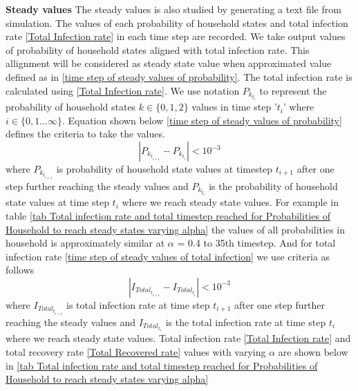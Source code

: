 \documentclass[paper=a4, fontsize=11pt, twoside, BCOR=12mm, parskip=full, listof=totoc]{scrreprt}
\begin{document}
{\par{\textbf{Steady values}}
The steady values is also studied by generating a text file from simulation. The values of each probability of household states and total infection rate \ref{Total Infection rate} in each time step are recorded. We take output values of probability of household states aligned with total infection rate. This allignment will be considered as steady state value when approximated value defined as in \ref{time step of steady values of probability}. The total infection rate is calculated using \ref{Total Infection rate}. We use notation $P_{k_{t_{i}}}$ to represent the probability of household states \( k \in \{0,1,2 \}\) values in time step '$t_{i}$' where \( i  \in \{0,1...\infty \} \).  
Equation shown below \ref{time step of steady values of probability} defines the criteria to take the values. 
\begin{equation}
\label{time step of steady values of probability}
 |P_{k_{t_{i+1}}}-P_{k_{t_{i}}}| < 10^{-3}
\end{equation} 
where $P_{k_{t_{i+1}}}$ is probability of household state values at timestep $t_{i+1}$ after one step further reaching the steady values and $P_{k_{t_{i}}}$ is the probability of household state values at time step $t_{i}$ where we reach steady state values. For example in table \ref{tab Total infection rate and total timestep reached for Probabilities of Household to reach steady states varying alpha} the values of all probabilities in household is approximately similar at $\alpha$ = 0.4 to 35th timestep.  
And for total infection rate \ref{time step of steady values of total infection} we use criteria as follows 
\begin{equation}
\label{time step of steady values of total infection}
 |I_{Total_{t_{i+1}}}-I_{Total_{{t_{i}}}}| < 10^{-3}
\end{equation} 
where $I_{Total_{t_{i+1}}}$ is total infection rate at time step $t_{i+1}$ after one step further reaching the steady values and $I_{Total_{t_{i}}}$ is the total infection rate at time step $t_{i}$ where we reach steady state values.
Total infection rate \ref{Total Infection rate} and total recovery rate \ref{Total Recovered rate} values  with varying $\alpha$ are shown below in \ref{tab Total infection rate and total timestep reached for Probabilities of Household to reach steady states varying alpha} 

}
\end{document}
